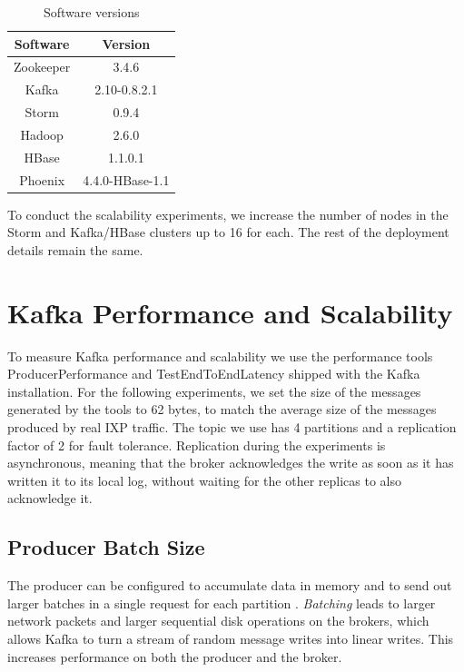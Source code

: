 \begin{table}[H]
\centering
\begin{tabular}{ |c|c| }
\hline
Software & Version \\ \hline \hline
Zookeeper & 3.4.6 \\ \hline
Kafka & 2.10-0.8.2.1 \\ \hline
Storm & 0.9.4 \\ \hline
Hadoop & 2.6.0 \\ \hline
HBase & 1.1.0.1 \\ \hline
Phoenix & 4.4.0-HBase-1.1 \\ \hline
\end{tabular}
\caption{Software versions}
\label{table:benchmarks_cluster_sw_specs}
\end{table}

To conduct the scalability experiments, we increase the number of nodes in the Storm and Kafka/HBase clusters up to 16 for each. The rest of the deployment details remain the same.


\section{Kafka Performance and Scalability}

To measure Kafka performance and scalability we use the performance tools ProducerPerformance and TestEndToEndLatency shipped with the Kafka installation. For the following experiments, we set the size of the messages generated by the tools to 62 bytes, to match the average size of the messages produced by real IXP traffic. The topic we use has 4 partitions and a replication factor of 2 for fault tolerance. Replication during the experiments is asynchronous, meaning that the broker acknowledges the write as soon as it has written it to its local log, without waiting for the other replicas to also acknowledge it.

\subsection{Producer Batch Size}\label{subsection:benchmarks_kafka_batch}

The producer can be configured to accumulate data in memory and to send out larger batches in a single request for each partition \cite{kafka_documentation}. \emph{Batching} leads to larger network packets and larger sequential disk operations on the brokers, which allows Kafka to turn a stream of random message writes into linear writes. This increases performance on both the producer and the broker. 

